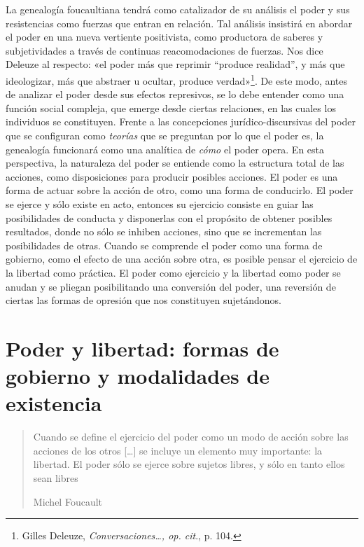 La genealogía foucaultiana tendrá como catalizador de su análisis el poder y sus resistencias como fuerzas que entran en relación. Tal análisis insistirá en abordar el poder en una nueva vertiente positivista, como productora de saberes y subjetividades a través de continuas reacomodaciones de fuerzas. Nos dice Deleuze al respecto: «el poder más que reprimir ``produce realidad'', y más que ideologizar, más que abstraer u ocultar, produce verdad»\footnote{Gilles Deleuze, \emph{Conversaciones\ldots, op. cit}., p. 104.}. De este modo, antes de analizar el poder desde sus efectos represivos, se lo debe entender como una función social compleja, que emerge desde ciertas relaciones, en las cuales los individuos se constituyen. Frente a las concepciones jurídico-discursivas del poder que se configuran como \emph{teorías} que se preguntan por lo que el poder es, la genealogía funcionará como una analítica de \emph{cómo} el poder opera. En esta perspectiva, la naturaleza del poder se entiende como la estructura total de las acciones, como disposiciones para producir posibles acciones. El poder es una forma de actuar sobre la acción de otro, como una forma de conducirlo. El poder se ejerce y sólo existe en acto, entonces su ejercicio consiste en guiar las posibilidades de conducta y disponerlas con el propósito de obtener posibles resultados, donde no sólo se inhiben acciones, sino que se incrementan las posibilidades de otras. Cuando se comprende el poder como una forma de gobierno, como el efecto de una acción sobre otra, es posible pensar el ejercicio de la libertad como práctica. El poder como ejercicio y la libertad como poder se anudan y se pliegan posibilitando una conversión del poder, una reversión de ciertas las formas de opresión que nos constituyen sujetándonos.

\section{Poder y libertad: formas de gobierno y modalidades de existencia}

\begin{quote}
Cuando se define el ejercicio del poder como un modo de acción sobre las acciones de los otros {[}\ldots{]} se incluye un elemento muy importante: la libertad. El poder sólo se ejerce sobre sujetos libres, y sólo en tanto ellos sean libres

Michel Foucault
\end{quote}

